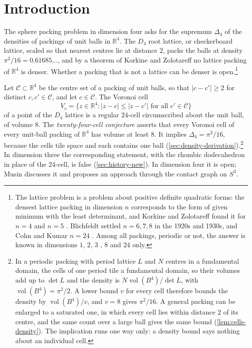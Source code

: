 \documentclass[11pt,reqno]{amsart}
\renewcommand{\_}{\origunderscore\allowbreak}
\numberwithin{equation}{section}
\theoremstyle{plain}
\theoremstyle{definition}
\theoremstyle{remark}
\DeclareMathOperator{\vol}{vol}
\begin{document}
\tableofcontents

\section{Introduction}\label{sec:intro}

The sphere packing problem in dimension four asks for the supremum
$\Delta_4$ of the densities of packings of unit balls in $\mathbb{R}^4$.
The $D_4$ root lattice, or checkerboard lattice, scaled so that nearest
centres lie at distance $2$, packs the balls at density
$\pi^2/16=0.61685\ldots$, and by a theorem of Korkine and Zolotareff
\cite{KZ1872} no lattice packing of $\mathbb{R}^4$ is denser. Whether a
packing that is not a lattice can be denser is open.\footnote{The lattice
  problem is a problem about positive definite quadratic forms: the densest
  lattice packing in dimension $n$ corresponds to the form of given minimum
  with the least determinant, and Korkine and Zolotareff found it for
  $n=4$ and $n=5$ \cite{KZ1872}. Blichfeldt settled $n=6,7,8$ in the
  1920s and 1930s, and Cohn and Kumar $n=24$ \cite{CK09}. Among all
  packings, periodic or not, the answer is known in dimensions $1$, $2$,
  $3$ \cite{Thu10,FT42,Hal05}, $8$ \cite{Via17} and $24$ \cite{CKM17}
  only.}

Let $\mathcal{C}\subset\mathbb{R}^4$ be the centre set of a packing of
unit balls, so that $|c-c'|\ge2$ for distinct $c,c'\in\mathcal{C}$, and
let $c\in\mathcal{C}$. The Voronoi cell
\[
  V_c=\bigl\{z\in\mathbb{R}^4 : |z-c|\le|z-c'| \text{ for all } c'\in\mathcal{C}\bigr\}
\]
of a point of the $D_4$ lattice is a regular $24$-cell circumscribed about
the unit ball, of volume $8$. The \emph{twenty-four-cell conjecture}
asserts that every Voronoi cell of every unit-ball packing of
$\mathbb{R}^4$ has volume at least $8$. It implies $\Delta_4=\pi^2/16$,
because the cells tile space and each contains one ball
(\cref{sec:density-derivation}).\footnote{In a periodic packing with
  period lattice $L$ and $N$ centres in a fundamental domain, the cells of
  one period tile a fundamental domain, so their volumes add up to $\det L$
  and the density is $N\vol(B^4)/\det L$, with $\vol(B^4)=\pi^2/2$. A lower
  bound $v$ for every cell therefore bounds the density by $\vol(B^4)/v$,
  and $v=8$ gives $\pi^2/16$. A general packing can be enlarged to a
  saturated one, in which every cell lies within distance $2$ of its centre,
  and the same count over a large ball gives the same bound
  (\cref{lem:cells-density}). The implication runs one way only: a density
  bound says nothing about an individual cell.} In dimension three the
corresponding statement, with the rhombic dodecahedron in place of the
$24$-cell, is false (\cref{sec:history-new}). In dimension four it is
open; Musin \cite{Mus18} discusses it and proposes an approach through the
contact graph on $S^3$.
\end{document}
